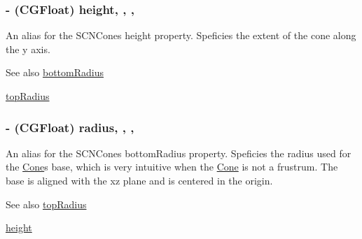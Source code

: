 \subsubsection[{height}]{\setlength{\rightskip}{0pt plus 5cm}-\/ (C\+G\+Float) height\hspace{0.3cm}{\ttfamily [read]}, {\ttfamily [write]}, {\ttfamily [nonatomic]}, {\ttfamily [assign]}}\label{interface_cone_ae423d684792ea4632334f06cb3c26fa4}
An alias for the S\+C\+N\+Cone\textquotesingle{}s {\ttfamily height} property. Speficies the extent of the cone along the {\ttfamily y} axis. \begin{DoxySeeAlso}{See also}
\hyperlink{interface_cone_a4c9e65faf1500b1bac399f0213318bd1}{bottom\+Radius} 

\hyperlink{interface_cone_a0050c318410d187cadee5a4dce2087f3}{top\+Radius} 
\end{DoxySeeAlso}
\hypertarget{interface_cone_ac227a3bdc7372a8ae73a3d70a4644b99}{}
\subsubsection[{radius}]{\setlength{\rightskip}{0pt plus 5cm}-\/ (C\+G\+Float) radius\hspace{0.3cm}{\ttfamily [read]}, {\ttfamily [write]}, {\ttfamily [nonatomic]}, {\ttfamily [assign]}}\label{interface_cone_ac227a3bdc7372a8ae73a3d70a4644b99}
An alias for the S\+C\+N\+Cone\textquotesingle{}s {\ttfamily bottom\+Radius} property. Speficies the radius used for the \hyperlink{interface_cone}{Cone}\textquotesingle{}s base, which is very intuitive when the \hyperlink{interface_cone}{Cone} is not a frustrum. The base is aligned with the {\ttfamily xz} plane and is centered in the origin. \begin{DoxySeeAlso}{See also}
\hyperlink{interface_cone_a0050c318410d187cadee5a4dce2087f3}{top\+Radius} 

\hyperlink{interface_cone_ae423d684792ea4632334f06cb3c26fa4}{height} 
\end{DoxySeeAlso}
\hypertarget{interface_cone_a0050c318410d187cadee5a4dce2087f3}{}
